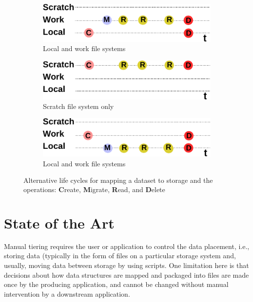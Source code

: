 \documentclass[a4paper]{article}
\begin{document}
\begin{figure}[H]
  \centering
  \begin{subfigure}{.3\textwidth}
  \includegraphics[width=0.9\columnwidth]{lifecycle-1}
  \caption{\label{fig:lifecycle1} Local and work file systems}
  \end{subfigure}
  \begin{subfigure}{.3\textwidth}
  \includegraphics[width=0.9\columnwidth]{lifecycle-2}
  \caption{\label{fig:lifecycle2} Scratch file system only}
  \end{subfigure}
  \begin{subfigure}{.3\textwidth}
  \includegraphics[width=0.9\columnwidth]{lifecycle-3}
  \caption{\label{fig:lifecycle3} Local and work file systems}
  \end{subfigure}
  \caption{Alternative life cycles for mapping a dataset to storage and the operations: \textbf{C}reate, \textbf{M}igrate, \textbf{R}ead, and \textbf{D}elete}
  \label{fig:lifecycle}
\end{figure}


\section{State of the Art}

Manual tiering requires the user or application to control the data placement, i.e., storing data (typically in the form of files on a particular storage system and, usually, moving data between storage by using scripts.
One limitation here is that decisions about how data structures are mapped and packaged into files are made once by the producing application, and cannot be changed without manual intervention by a downstream application.
\end{document}
